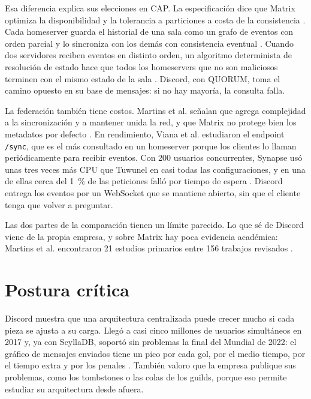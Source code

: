 \documentclass[11pt,a4paper]{article}
\begin{document}
Esa diferencia explica sus elecciones en CAP. La especificación dice que Matrix optimiza la disponibilidad y la tolerancia a particiones a costa de la consistencia \cite{MatrixSpec}. Cada homeserver guarda el historial de una sala como un grafo de eventos con orden parcial y lo sincroniza con los demás con consistencia eventual \cite{MatrixSpec}. Cuando dos servidores reciben eventos en distinto orden, un algoritmo determinista de resolución de estado hace que todos los homeservers que no son maliciosos terminen con el mismo estado de la sala \cite{Martins2026}. Discord, con QUORUM, toma el camino opuesto en su base de mensajes: si no hay mayoría, la consulta falla.

La federación también tiene costos. Martins et al. señalan que agrega complejidad a la sincronización y a mantener unida la red, y que Matrix no protege bien los metadatos por defecto \cite{Martins2026}. En rendimiento, Viana et al. estudiaron el endpoint \texttt{/sync}, que es el más consultado en un homeserver porque los clientes lo llaman periódicamente para recibir eventos. Con 200 usuarios concurrentes, Synapse usó unas tres veces más CPU que Tuwunel en casi todas las configuraciones, y en una de ellas cerca del 1~\% de las peticiones falló por tiempo de espera \cite{Viana2026}. Discord entrega los eventos por un WebSocket que se mantiene abierto, sin que el cliente tenga que volver a preguntar.

Las dos partes de la comparación tienen un límite parecido. Lo que sé de Discord viene de la propia empresa, y sobre Matrix hay poca evidencia académica: Martins et al. encontraron 21 estudios primarios entre 156 trabajos revisados \cite{Martins2026}.

\section{Postura crítica}\label{sec:postura}

Discord muestra que una arquitectura centralizada puede crecer mucho si cada pieza se ajusta a su carga. Llegó a casi cinco millones de usuarios simultáneos en 2017 \cite{Vishnevskiy2017elixir} y, ya con ScyllaDB, soportó sin problemas la final del Mundial de 2022: el gráfico de mensajes enviados tiene un pico por cada gol, por el medio tiempo, por el tiempo extra y por los penales \cite{Ingram2023}. También valoro que la empresa publique sus problemas, como los tombstones o las colas de los guilds, porque eso permite estudiar su arquitectura desde afuera.
\end{document}
